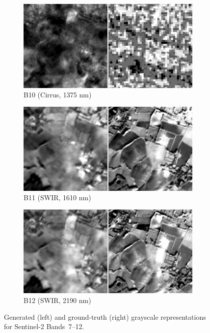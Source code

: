 \begin{figure}[p]
    \vspace{0.5em}
    \begin{subfigure}{0.48\textwidth}
        \centering
        \includegraphics[width=\linewidth]{img/bands_gray/sample_000008_B11_panel.png}
        \caption{B10 (Cirrus, 1375 nm)}
    \end{subfigure}\hfill
    \begin{subfigure}{0.48\textwidth}
        \centering
        \includegraphics[width=\linewidth]{img/bands_gray/sample_000008_B12_panel.png}
        \caption{B11 (SWIR, 1610 nm)}
    \end{subfigure}

    \vspace{0.5em}
    \begin{subfigure}{0.48\textwidth}
        \centering
        \includegraphics[width=\linewidth]{img/bands_gray/sample_000008_B13_panel.png}
        \caption{B12 (SWIR, 2190 nm)}
    \end{subfigure}

    \caption[Bandwise grayscale reconstructions (Bands 7–12)]%
    {Generated (left) and ground-truth (right) grayscale representations for Sentinel-2 Bands~7–12.}
\end{figure}

